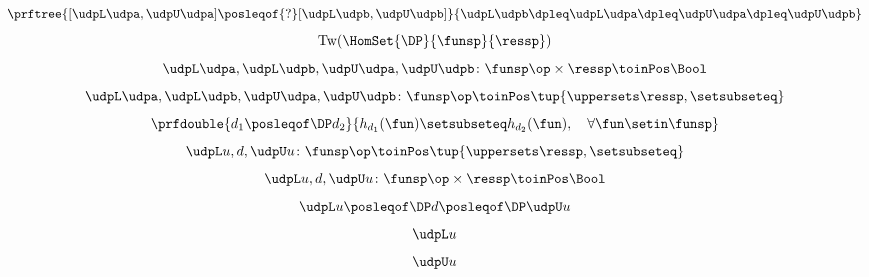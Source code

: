 {\begin{forslides}
        \begin{equation}
            \label{eq:order_udp_1}
            \prftree{[\udpL\udpa,\udpU\udpa] \posleqof{?} [\udpL\udpb,\udpU\udpb]}{\udpL\udpb\dpleq\udpL\udpa\dpleq\udpU\udpa\dpleq\udpU\udpb}
        \end{equation}
        \begin{equation}
            \label{eq:order_udp_2}
            \text{Tw}(\HomSet{\DP}{\funsp}{\ressp})
        \end{equation}
        \begin{equation}
            \label{eq:order_udp_3}
            \udpL\udpa,\udpL\udpb,\udpU\udpa,\udpU\udpb\colon \funsp\op \times \ressp \toinPos \Bool
        \end{equation}
        \begin{equation}
            \label{eq:order_udp_4}
            \udpL\udpa,\udpL\udpb,\udpU\udpa,\udpU\udpb\colon \funsp\op \toinPos  \tup{\uppersets \ressp, \setsubseteq}
        \end{equation}
        \begin{equation}
            \label{eq:upos_dp_def_4}
            \prfdouble{d_1\posleqof\DP d_2}{h_{d_1}(\fun)\setsubseteq h_{d_2}(\fun), \quad \forall \fun \setin \funsp}
        \end{equation}
        \begin{equation}
            \label{eq:order_udp_5}
            \udpL u,d,\udpU u\colon \funsp\op \toinPos  \tup{\uppersets \ressp, \setsubseteq}
        \end{equation}
        \begin{equation}
            \label{eq:order_udp_6}
            \udpL u,d,\udpU u\colon  \funsp\op \times \ressp \toinPos \Bool
        \end{equation}
        \begin{equation}
            \label{eq:order_udp_7}
            \udpL u \posleqof\DP d \posleqof\DP \udpU u
        \end{equation}
        \begin{equation}
            \label{eq:order_udp_8}
            \udpL u
        \end{equation}
        \begin{equation}
            \label{eq:order_udp_9}
            \udpU u
        \end{equation}
        \begin{equation}
            \label{eq:order_udp_10}
            \begin{aligned}

\end{aligned}
\end{equation}
\end{forslides}}
